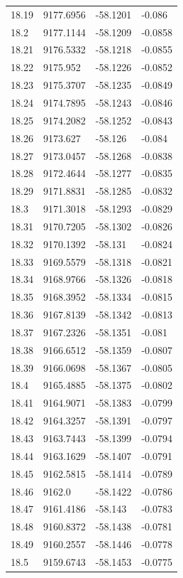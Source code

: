 \begin{table}[H]
\begin{tabular}{llll}
18.19 & 9177.6956 & -58.1201 & -0.086 \\
18.2 & 9177.1144 & -58.1209 & -0.0858 \\
18.21 & 9176.5332 & -58.1218 & -0.0855 \\
18.22 & 9175.952 & -58.1226 & -0.0852 \\
18.23 & 9175.3707 & -58.1235 & -0.0849 \\
18.24 & 9174.7895 & -58.1243 & -0.0846 \\
18.25 & 9174.2082 & -58.1252 & -0.0843 \\
18.26 & 9173.627 & -58.126 & -0.084 \\
18.27 & 9173.0457 & -58.1268 & -0.0838 \\
18.28 & 9172.4644 & -58.1277 & -0.0835 \\
18.29 & 9171.8831 & -58.1285 & -0.0832 \\
18.3 & 9171.3018 & -58.1293 & -0.0829 \\
18.31 & 9170.7205 & -58.1302 & -0.0826 \\
18.32 & 9170.1392 & -58.131 & -0.0824 \\
18.33 & 9169.5579 & -58.1318 & -0.0821 \\
18.34 & 9168.9766 & -58.1326 & -0.0818 \\
18.35 & 9168.3952 & -58.1334 & -0.0815 \\
18.36 & 9167.8139 & -58.1342 & -0.0813 \\
18.37 & 9167.2326 & -58.1351 & -0.081 \\
18.38 & 9166.6512 & -58.1359 & -0.0807 \\
18.39 & 9166.0698 & -58.1367 & -0.0805 \\
18.4 & 9165.4885 & -58.1375 & -0.0802 \\
18.41 & 9164.9071 & -58.1383 & -0.0799 \\
18.42 & 9164.3257 & -58.1391 & -0.0797 \\
18.43 & 9163.7443 & -58.1399 & -0.0794 \\
18.44 & 9163.1629 & -58.1407 & -0.0791 \\
18.45 & 9162.5815 & -58.1414 & -0.0789 \\
18.46 & 9162.0 & -58.1422 & -0.0786 \\
18.47 & 9161.4186 & -58.143 & -0.0783 \\
18.48 & 9160.8372 & -58.1438 & -0.0781 \\
18.49 & 9160.2557 & -58.1446 & -0.0778 \\
18.5 & 9159.6743 & -58.1453 & -0.0775 \\

\end{tabular}
\end{table}
